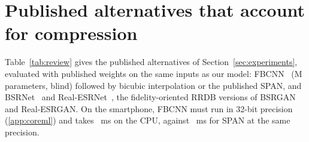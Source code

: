\begin{table}[H]
\centering
\caption{Identification of synthesised probes (\SynProbes{} images of \SynSubj{} EarVN1.0 subjects) after $\times4$ upscaling. First row of each block: rank-1 rate of bicubic upscaling (\%); other rows: paired difference from it in percentage points, with 95\% confidence interval. Fine-tuned rows average the models of the folds. Probes are large images of the test subjects not used for enrolment, resized to four times the probe size and degraded as in the benchmark; templates and recognisers (trained on large images only) are those of Table~\ref{tab:recog}.}
\label{tab:recogsynth}
\end{table}

\section{Published alternatives that account for compression}
\label{app:alternatives}
Table~\ref{tab:review} gives the published alternatives of Section~\ref{sec:experiments}, evaluated with published weights on the same inputs as our model: FBCNN~\cite{jiang2021fbcnn} (\RevFbcnnParams{}M parameters, blind) followed by bicubic interpolation or the published SPAN, and BSRNet~\cite{zhang2021bsrgan} and Real-ESRNet~\cite{wang2021realesrgan}, the fidelity-oriented RRDB versions of BSRGAN and Real-ESRGAN. On the smartphone, FBCNN must run in 32-bit precision (\ref{app:coreml}) and takes \LatPhoneFbCpu{}~ms on the CPU, against \LatPhoneSpanFCpu{}~ms for SPAN at the same precision.

